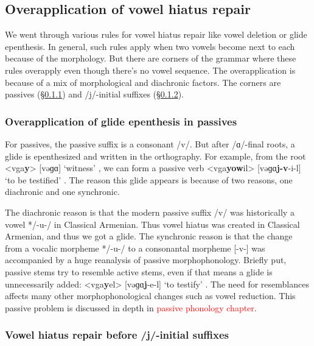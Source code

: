 {	\subsection{Overapplication of vowel hiatus repair}\label{section:syllable:VowelHiatus:Over}
	We went through various    rules for vowel hiatus repair like vowel deletion or glide epenthesis. In general, such rules apply when two vowels become next to each because of the morphology. But there are corners of the grammar where these rules overapply even though there's no vowel sequence. The overapplication is because of a mix of morphological and diachronic factors. The  corners are passives (\S\ref{section:syllable:VowelHiatus:Over:Passive}) and /j/-initial suffixes (\S\ref{section:syllable:VowelHiatus:Over:Ja}). 
	
	\subsubsection{Overapplication of glide epenthesis in passives}\label{section:syllable:VowelHiatus:Over:Passive}
	
	For passives, the passive suffix is a consonant /v/. But after /ɑ/-final roots, a glide is epenthesized and written in the orthography. For example, from the root   <vga\textbf{y}> [vəɡɑ] `witness' , we can form a passive verb <vga\textbf{yow}il> [vəɡɑ\textbf{j-v}-i-l] `to be testified' . The reason this glide appears is because of two reasons, one diachronic and one synchronic. 
	
	The diachronic reason is that the modern passive suffix /v/ was historically a vowel */-u-/ in Classical Armenian. Thus vowel hiatus was created in Classical Armenian, and thus we got a glide. The synchronic reason is that the change from a vocalic morpheme */-u-/ to a consonantal morpheme [-v-] was accompanied by a huge reanalysis of passive morphophonology. Briefly put, passive stems try to resemble active stems, even if that means a glide is unnecessarily added: <vga\textbf{y}el> [vəɡɑ\textbf{j}-e-l] `to testify' . The need for resemblances affects many other morphophonological changes such as vowel reduction.  This passive problem is discussed in depth in \textcolor{red}{passive phonology chapter}. 
	
	\subsubsection{Vowel hiatus repair before /j/-initial suffixes} \label{section:syllable:VowelHiatus:Over:Ja}
	
}
